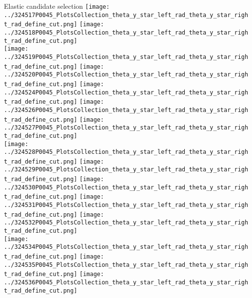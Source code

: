 \documentclass{beamer}
\begin{document}
\begin{frame}
\begin{block}{Elastic candidate selection}
                \texttt{[image: ../324517P0045\_PlotsCollection\_theta\_y\_star\_left\_rad\_theta\_y\_star\_right\_rad\_define\_cut.png]}
                \texttt{[image: ../324518P0045\_PlotsCollection\_theta\_y\_star\_left\_rad\_theta\_y\_star\_right\_rad\_define\_cut.png]}\\
                \texttt{[image: ../324519P0045\_PlotsCollection\_theta\_y\_star\_left\_rad\_theta\_y\_star\_right\_rad\_define\_cut.png]}
                \texttt{[image: ../324520P0045\_PlotsCollection\_theta\_y\_star\_left\_rad\_theta\_y\_star\_right\_rad\_define\_cut.png]}
                \texttt{[image: ../324524P0045\_PlotsCollection\_theta\_y\_star\_left\_rad\_theta\_y\_star\_right\_rad\_define\_cut.png]}
                \texttt{[image: ../324526P0045\_PlotsCollection\_theta\_y\_star\_left\_rad\_theta\_y\_star\_right\_rad\_define\_cut.png]}
                \texttt{[image: ../324527P0045\_PlotsCollection\_theta\_y\_star\_left\_rad\_theta\_y\_star\_right\_rad\_define\_cut.png]}\\
                \texttt{[image: ../324528P0045\_PlotsCollection\_theta\_y\_star\_left\_rad\_theta\_y\_star\_right\_rad\_define\_cut.png]}
                \texttt{[image: ../324529P0045\_PlotsCollection\_theta\_y\_star\_left\_rad\_theta\_y\_star\_right\_rad\_define\_cut.png]}
                \texttt{[image: ../324530P0045\_PlotsCollection\_theta\_y\_star\_left\_rad\_theta\_y\_star\_right\_rad\_define\_cut.png]}
                \texttt{[image: ../324531P0045\_PlotsCollection\_theta\_y\_star\_left\_rad\_theta\_y\_star\_right\_rad\_define\_cut.png]}
                \texttt{[image: ../324532P0045\_PlotsCollection\_theta\_y\_star\_left\_rad\_theta\_y\_star\_right\_rad\_define\_cut.png]}\\
                \texttt{[image: ../324534P0045\_PlotsCollection\_theta\_y\_star\_left\_rad\_theta\_y\_star\_right\_rad\_define\_cut.png]}
                \texttt{[image: ../324535P0045\_PlotsCollection\_theta\_y\_star\_left\_rad\_theta\_y\_star\_right\_rad\_define\_cut.png]}
                \texttt{[image: ../324536P0045\_PlotsCollection\_theta\_y\_star\_left\_rad\_theta\_y\_star\_right\_rad\_define\_cut.png]}

        \end{block}
\end{frame}
\end{document}
